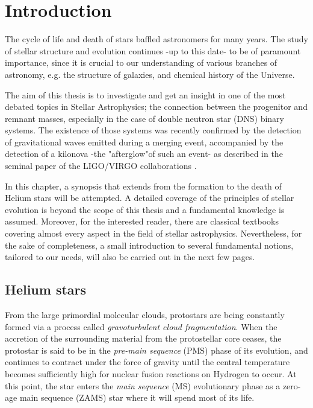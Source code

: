 \documentclass[../../main/thesis_msc.tex]{subfiles}
\begin{document}
    \chapter{Introduction}
    
		The cycle of life and death of stars  baffled astronomers for many years. The study of stellar structure and evolution continues -up to this date- to be of paramount importance, since it is crucial to our understanding of various branches of astronomy, e.g. the structure of galaxies, and chemical history of the Universe.
		
		The aim of this thesis is to investigate and get an insight in one of the most debated topics in Stellar Astrophysics; the connection between the progenitor and remnant masses, especially in the case of double neutron star (DNS) binary systems. The existence of those systems was recently confirmed by the detection of gravitational waves emitted during a merging event, accompanied by the detection of a kilonova -the "afterglow"of such an event- as described in the seminal paper of the LIGO/VIRGO collaborations \citep{ligo}.
		
		In this chapter, a synopsis that extends from the formation to the death of Helium stars will be attempted. A detailed coverage of the principles of stellar evolution is beyond the scope of this thesis and a fundamental knowledge is assumed. Moreover, for the interested reader, there are classical textbooks \citep{Kipp_book, Clayton, Prialnik, Eggleton_book} covering almost every aspect in the field of stellar astrophysics. Nevertheless, for the sake of completeness, a small introduction to several fundamental notions, tailored to our needs, will also be carried out in the next few pages. 
		

    
    
    \section{Helium stars}
    	
    	From the large primordial molecular clouds, protostars are being constantly formed via a process called \emph{gravoturbulent cloud fragmentation}. When the accretion of the surrounding material from the protostellar core ceases, the protostar is said to be in the \emph{pre-main sequence} (PMS) phase of its evolution, and continues to contract under the force of gravity until the central temperature becomes sufficiently high for nuclear fusion reactions on Hydrogen to occur. At this point, the star enters the \emph{main sequence} (MS) evolutionary phase as a zero-age main sequence (ZAMS) star where it will spend most of its life.
    	
\end{document}
